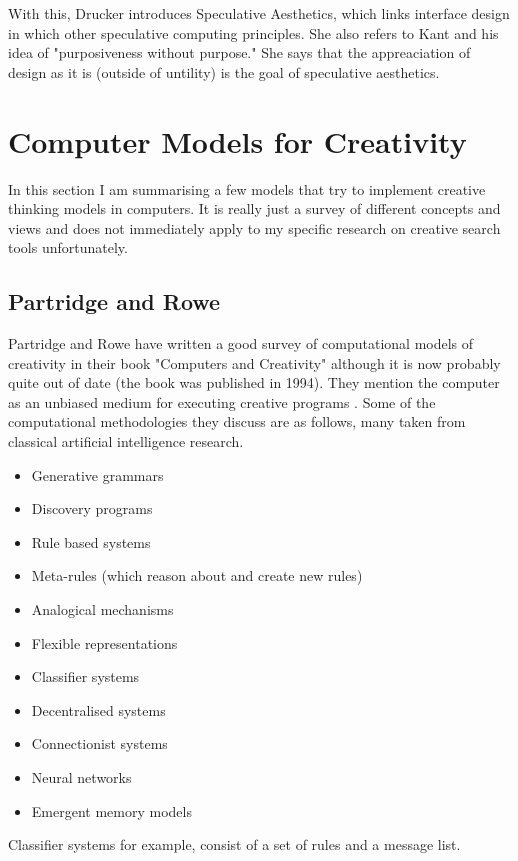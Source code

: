 With this, Drucker introduces Speculative Aesthetics, which links interface design in which other speculative computing principles. She also refers to Kant and his idea of "purposiveness without purpose." She says that the appreaciation of design as it is (outside of untility) is the goal of speculative aesthetics.

\section{Computer Models for Creativity}

In this section I am summarising a few models that try to implement creative thinking models in computers. It is really just a survey of different concepts and views and does not immediately apply to my specific research on creative search tools unfortunately.

\subsection{Partridge and Rowe}

Partridge and Rowe have written a good survey of computational models of creativity in their book "Computers and Creativity" \citep{Partridge1994} although it is now probably quite out of date (the book was published in 1994). They mention the computer as an unbiased medium for executing creative programs \citep[p.26]{Partridge1994}. Some of the computational methodologies they discuss are as follows, many taken from classical artificial intelligence research.

\begin{itemize}
  \item Generative  grammars
  \item Discovery programs
  \item Rule based systems
  \item Meta-rules (which reason about and create new rules)
  \item Analogical mechanisms
  \item Flexible representations
  \item Classifier systems
  \item Decentralised systems
  \item Connectionist systems
  \item Neural networks
  \item Emergent memory models
\end{itemize}

Classifier systems for example, consist of a set of rules and a message list.

